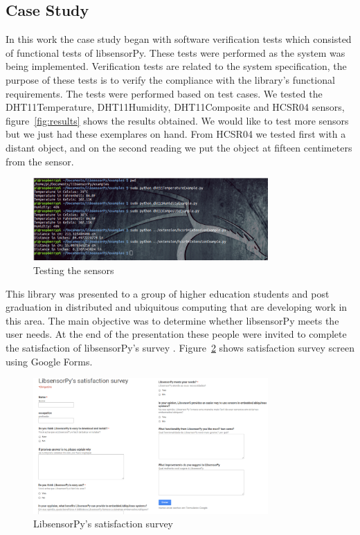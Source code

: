 \documentclass{acm_proc_article-sp}
\begin{document}
\subsection{Case Study}
In this work the case study began with software verification tests which consisted of functional tests of libsensorPy. These tests were performed as the system was being implemented.
\newline
\newline
Verification tests are related to the system specification, the purpose of these tests is to verify the compliance with the library's functional requirements. The tests were performed based on test cases.
\newline
\newline
We tested the DHT11Temperature, DHT11Humidity, DHT11Composite and HCSR04 sensors, figure~\ref{fig:results} shows the results obtained. We would like to test more sensors but we just had these exemplares on hand. From HCSR04 we tested first with a distant object, and on the second reading we put the object at fifteen centimeters from the sensor.
\begin{figure}[t]
    \centering
    	\includegraphics[width=0.8\textwidth]{pictures/tests.png}
    		\caption{Testing the sensors}  
    		\label{fig:survey}  	
\end{figure}

This library was presented to a group of higher education students and post graduation in distributed and ubiquitous computing that are developing work in this area. The main objective was to determine whether libsensorPy meets the user needs.
\newline
\newline
At the end of the presentation these people were invited to complete the satisfaction of libsensorPy's survey . Figure~\ref{fig:survey} shows satisfaction survey screen using Google Forms.

\begin{figure}[t]
    \centering
    	\includegraphics[width=0.8\textwidth]{pictures/survey2.png}
    		\caption{LibsensorPy's satisfaction survey}  
    		\label{fig:survey}  	
\end{figure}
\end{document}
